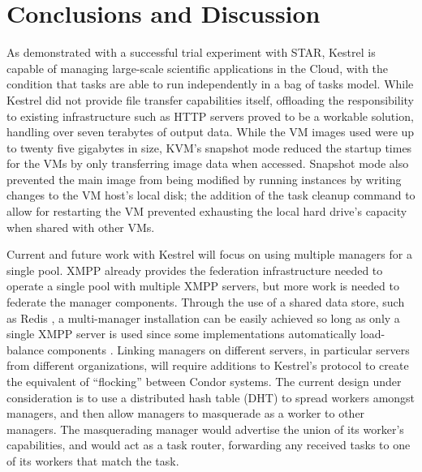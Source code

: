 \chapter{Conclusions and Discussion}
\label{chap:Conclusions}
As demonstrated with a successful trial experiment with STAR, Kestrel
is capable of managing large-scale scientific applications in the
Cloud, with the condition that tasks are able to run independently
in a bag of tasks model. While Kestrel did not provide file transfer
capabilities itself, offloading the responsibility to existing infrastructure
such as HTTP servers proved to be a workable solution, handling over
seven terabytes of output data. While the VM images used were up to
twenty five gigabytes in size, KVM's snapshot mode reduced the startup
times for the VMs by only transferring image data when accessed. Snapshot
mode also prevented the main image from being modified by running
instances by writing changes to the VM host's local disk; the addition
of the task cleanup command to allow for restarting the VM prevented
exhausting the local hard drive's capacity when shared with other
VMs.

Current and future work with Kestrel will focus on using multiple
managers for a single pool. XMPP already provides the federation infrastructure
needed to operate a single pool with multiple XMPP servers, but more
work is needed to federate the manager components. Through the use
of a shared data store, such as Redis \cite{Redis}, a multi-manager
installation can be easily achieved so long as only a single XMPP
server is used since some implementations automatically load-balance
components \cite{ejabberd}. Linking managers on different servers,
in particular servers from different organizations, will require additions
to Kestrel's protocol to create the equivalent of {}``flocking''
between Condor systems. The current design under consideration is
to use a distributed hash table (DHT) to spread workers amongst managers,
and then allow managers to masquerade as a worker to other managers.
The masquerading manager would advertise the union of its worker's
capabilities, and would act as a task router, forwarding any received
tasks to one of its workers that match the task.
